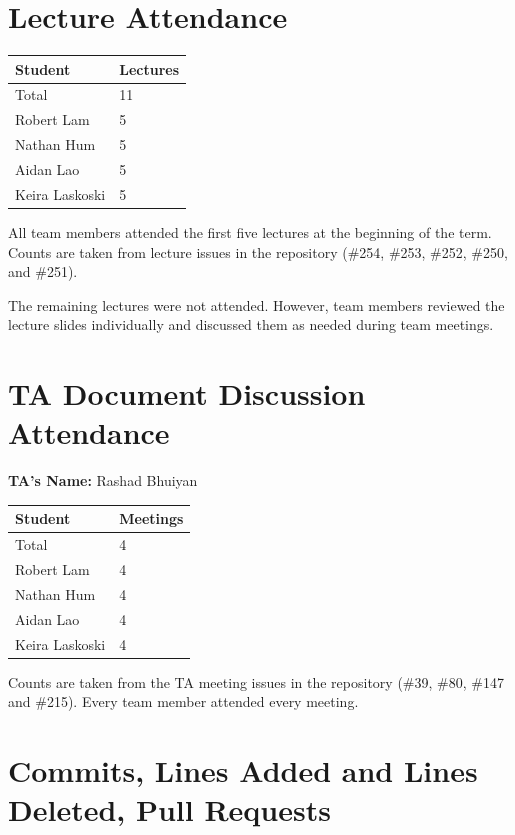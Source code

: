 \documentclass{article}
\begin{document}
\section{Lecture Attendance}

\begin{table}[H]
\centering
\begin{tabular}{ll}
\toprule
\textbf{Student} & \textbf{Lectures}\\
\midrule
Total & 11\\
Robert Lam & 5 \\
Nathan Hum & 5 \\
Aidan Lao & 5 \\
Keira Laskoski & 5 \\
\bottomrule
\end{tabular}
\end{table}

All team members attended the first five lectures at the beginning of the term. 
Counts are taken from lecture issues in the repository (\#254, \#253, \#252, \#250, and \#251).

The remaining lectures were not attended. However, team members reviewed the lecture 
slides individually and discussed them as needed during team meetings.

\section{TA Document Discussion Attendance}

\noindent \textbf{TA's Name: } Rashad Bhuiyan

\begin{table}[H]
\centering
\begin{tabular}{ll}
\toprule
\textbf{Student} & \textbf{Meetings}\\
\midrule
Total & 4\\
Robert Lam & 4\\
Nathan Hum & 4\\
Aidan Lao & 4\\
Keira Laskoski & 4\\
\bottomrule
\end{tabular}
\end{table}

Counts are taken from the TA meeting issues in the repository (\#39, \#80,
\#147 and \#215). Every team member attended every meeting.

\section{Commits, Lines Added and Lines Deleted, Pull Requests}
\end{document}
